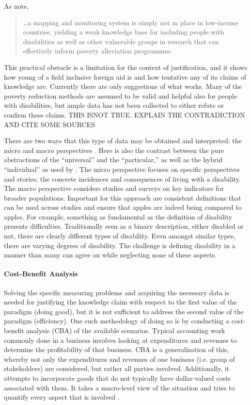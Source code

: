 \documentclass[a4paper]{article}
\begin{document}
As \cite{ingstad2011disability} note, 

\begin{quote}
\ldots a mapping and monitoring system is simply not in place in low-income
countries, yielding a weak knowledge base for including people with
disabilities as well as other vulnerable groups in research that can
effectively inform poverty alleviation programmes.
\end{quote}

This practical obstacle is a limitation for the context of justification, and
it shows how young of a field inclusive foreign aid is and how tentative any
of its claims of knowledge are. Currently there are only suggestions of what
works. Many of the poverty reduction methods are assumed to be valid and
helpful also for people with disabilities, but ample data has not been
collected to either refute or confirm these claims.  THIS ISNOT TRUE. EXPLAIN
THE CONTRADICTION AND CITE SOME SOURCES

There are two ways that this type of data may be obtained and interpreted: the
micro and macro perspectives \citep{ingstad2011disability}. Here is also the
contrast between the pure abstractions of the ``universal'' and the
``particular,'' as well as the hybrid ``individual'' as used by
\cite{collingwood1922history}. The micro perspective focuses on specific
perspectives and stories; the  concrete incidences and consequences of living
with a disability. The macro perspective considers studies and surveys on key
indicators for broader populations. Important for this approach are consistent
definitions that can be used across studies and ensure that apples are indeed
being compared to apples. For example, something as fundamental as the
definition of disability presents difficulties. Traditionally seen as a binary
description, either disabled or not, there are clearly different types of
disability. Even amongst similar types, there are varying degrees of
disability. The challenge is defining disability in a manner than many can
agree on while neglecting none of these aspects.

\paragraph{Cost-Benefit Analysis} Solving the specific measuring problems and
acquiring the necessary data is needed for justifying the knowledge claim with
respect to the first value of the paradigm (doing good), but it is not
sufficient to address the second value of the paradigm (efficiency). One such
methodology of doing so is by conducting a cost-benefit analysis (CBA) of the
available scenarios. Typical accounting work commonly done in a business
involves looking at expenditures and revenues to determine the profitability
of that business. CBA is a generalization of this, whereby not only the
expenditures and revenues of one business (i.e. group of stakeholders) are
considered, but rather all parties involved. Additionally, it attempts to
incorporate goods that do not typically have dollar-valued costs associated
with them. It takes a macro-level view of the situation and tries to quantify
every aspect that is involved \cite{mishan2015elements}.
\end{document}
